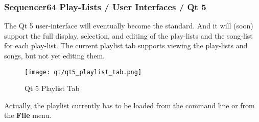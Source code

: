 \subsubsection{Sequencer64 Play-Lists / User Interfaces / Qt 5}
\label{subsubsec:playlist_ui_qt}

   The Qt 5 user-interface will eventually become the standard.
   And it will (soon) support the full display, selection, and editing of the
   play-lists and the song-list for each play-list.
   The current playlist tab supports viewing the play-lists and songs, but not
   yet editing them.

\begin{figure}[H]
   \centering 
   \texttt{[image: qt/qt5\_playlist\_tab.png]}
   \caption*{Qt 5 Playlist Tab}
\end{figure}

   Actually, the playlist currently has to be loaded from the command line or
   from the \textbf{File} menu.


